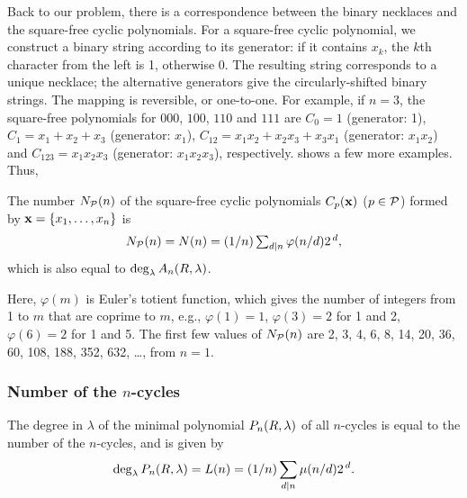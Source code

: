 \documentclass[twocolumn]{revtex4-1}
\begin{document}
Back to our problem, there is
  a correspondence between the binary necklaces
  and the square-free cyclic polynomials.
For a square-free cyclic polynomial,
  we construct a binary string according to its generator:
if it contains $x_k$, the $k$th character from the left is 1,
  otherwise 0.
The resulting string corresponds to a unique necklace;
  the alternative generators give
  the circularly-shifted binary strings.
The mapping is reversible, or one-to-one.
For example, if $n = 3$,
 the square-free polynomials for $000$, $100$, $110$ and $111$ are
  $C_0 = 1$ (generator: 1),
  $C_1 = x_1 + x_2 + x_3$ (generator: $x_1$),
  $C_{12} = x_1 x_2 + x_2 x_3 + x_3 x_1$ (generator: $x_1 x_2$)
  and $C_{123} = x_1 x_2 x_3$ (generator: $x_1 x_2 x_3$), respectively.
 shows a few more examples.
%
Thus,
%
\begin{theorem}
The number $N_\mathcal P(n)$ of the square-free cyclic polynomials $C_p(\mathbf{x})$ ($p \in \mathcal P$)
  formed by $\mathbf{x} = \{x_1, \ldots, x_n\}$ is
\begin{equation}
  N_\mathcal P(n) = N(n) = (1/n) \textstyle\sum_{d|n} \varphi(n/d) 2^{\,d},
\label{eq:necklace}
\end{equation}
%
which is also equal to $\deg_\lambda A_n(R, \lambda)$.
\label{thm:necklace}
\end{theorem}
%
Here, $\varphi(m)$ is Euler's totient function,
which gives the number of integers from 1 to $m$
  that are coprime to $m$,
  e.g.,
  $\varphi(1) = 1$,
  $\varphi(3) = 2$ for 1 and 2,
  $\varphi(6) = 2$ for 1 and 5.
The first few values of $N_\mathcal P(n)$ are 2, 3, 4, 6, 8, 14, 20, 36, 60, 108, 188, 352, 632, \ldots,
  from $n = 1$.



\subsubsection{Number of the $n$-cycles}


\begin{theorem}
The degree in $\lambda$ of the minimal polynomial $P_n(R, \lambda)$ of all $n$-cycles
  is equal to the number of the $n$-cycles,
  and is given by
\begin{equation}
  \deg_\lambda P_n(R, \lambda) = L(n) = (1/n)\sum_{d | n} \mu(n/d) 2^{\,d}.
\label{eq:lyndon}
\end{equation}
\label{thm:lyndon}
\end{theorem}
\end{document}
